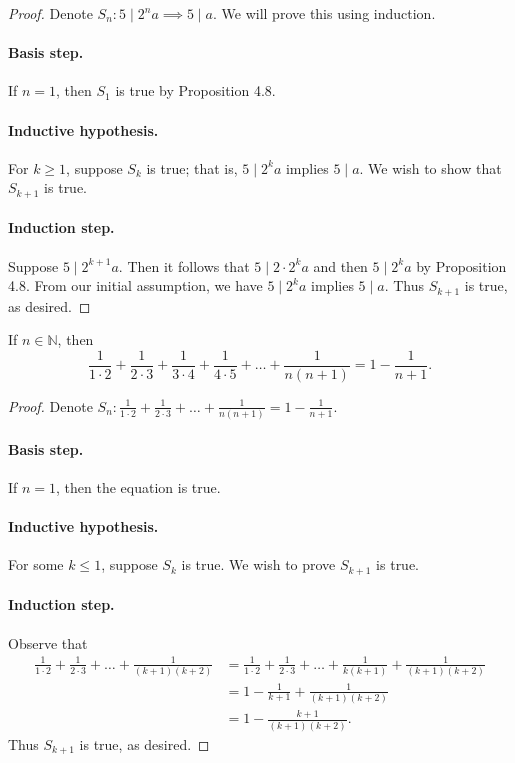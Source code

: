 \documentclass{exam}
\begin{document}
\begin{proof}
    Denote $S_n:5\mid2^na\implies5\mid a$. We will prove this using induction.
    \paragraph{Basis step.} If $n=1$, then $S_1$ is true by Proposition 4.8.
    \paragraph{Inductive hypothesis.} For $k\ge1$, suppose $S_k$ is true; that is, $5\mid2^ka$ implies $5\mid a$. We wish to show that $S_{k+1}$ is true.
    \paragraph{Induction step.} Suppose $5\mid2^{k+1}a$. Then it follows that $5\mid2\cdot2^ka$ and then $5\mid2^ka$ by Proposition 4.8. From our initial assumption, we have $5\mid2^ka$ implies $5\mid a$. Thus $S_{k+1}$ is true, as desired.
\end{proof}

\begin{proposition}{10.15}
    If $n\in\mathbb N$, then $$\frac1{1\cdot2}+\frac1{2\cdot3}+\frac1{3\cdot4}+\frac1{4\cdot5}+\dots+\frac1{n(n+1)} = 1-\frac1{n+1}.$$
\end{proposition}

\begin{proof}
    Denote $S_n: \frac1{1\cdot2} + \frac1{2\cdot3} + \dots + \frac1{n(n+1)} = 1-\frac1{n+1}$.
    \paragraph{Basis step.} If $n=1$, then the equation is true.
    \paragraph{Inductive hypothesis.} For some $k \le 1$, suppose $S_k$ is true. We wish to prove $S_{k+1}$ is true.
    \paragraph{Induction step.} Observe that
    \begin{align*}
        \frac1{1\cdot2}+\frac1{2\cdot3}+\dots+\frac1{(k+1)(k+2)}&=\frac1{1\cdot2}+\frac1{2\cdot3}+\dots+\frac1{k(k+1)}+\frac1{(k+1)(k+2)}\\
        &=1-\frac1{k+1}+\frac1{(k+1)(k+2)}\\
        &=1-\frac{k+1}{(k+1)(k+2)}.
    \end{align*}
    Thus $S_{k+1}$ is true, as desired.
\end{proof}
\end{document}
